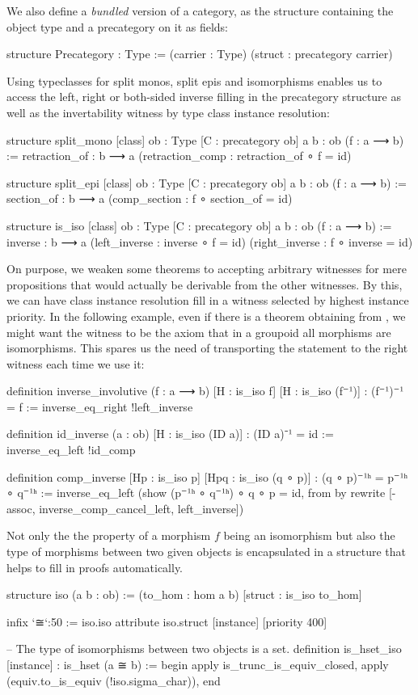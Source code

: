 We also define a \emph{bundled} version of a category, as the structure containing
the object type and a precategory on it as fields:
\begin{leancode}
structure Precategory : Type :=
  (carrier : Type)
  (struct : precategory carrier)
\end{leancode}

Using typeclasses for split monos, split epis and isomorphisms enables us to access
the left, right or both-sided inverse filling in the precategory structure as
well as the invertability witness by type class instance resolution:
\begin{leancode}
structure split_mono [class]
    {ob : Type} [C : precategory ob] {a b : ob} (f : a ⟶ b) :=
  {retraction_of : b ⟶ a}
  (retraction_comp : retraction_of ∘ f = id)

structure split_epi [class]
    {ob : Type} [C : precategory ob] {a b : ob} (f : a ⟶ b) :=
  {section_of : b ⟶ a}
  (comp_section : f ∘ section_of = id)

structure is_iso [class]
    {ob : Type} [C : precategory ob] {a b : ob} (f : a ⟶ b) :=
  {inverse : b ⟶ a}
  (left_inverse  : inverse ∘ f = id)
  (right_inverse : f ∘ inverse = id)
\end{leancode}

On purpose, we weaken some theorems to accepting arbitrary witnesses for mere propositions
that would actually be derivable from the other witnesses.
By this, we can have class instance resolution fill in a witness selected by
highest instance priority.
In the following example, even if there is a theorem obtaining 
from , we might want the witness to be the axiom that in a groupoid
all morphisms are isomorphisms.
This spares us the need of transporting the statement to the right witness each
time we use it:
\begin{leancode}
definition inverse_involutive (f : a ⟶ b) [H : is_iso f] [H : is_iso (f⁻¹)]
  : (f⁻¹)⁻¹ = f :=
inverse_eq_right !left_inverse

definition id_inverse (a : ob) [H : is_iso (ID a)] : (ID a)⁻¹ = id :=
inverse_eq_left !id_comp

definition comp_inverse [Hp : is_iso p] [Hpq : is_iso (q ∘ p)] :
  (q ∘ p)⁻¹ʰ = p⁻¹ʰ ∘ q⁻¹ʰ :=
inverse_eq_left (show (p⁻¹ʰ ∘ q⁻¹ʰ) ∘ q ∘ p = id, from
  by rewrite [-assoc, inverse_comp_cancel_left, left_inverse])
\end{leancode}

Not only the the property of a morphism $f$ being an isomorphism but also the type
of morphisms between two given objects is encapsulated in a structure that
helps to fill in proofs automatically. %
\begin{leancode}
structure iso (a b : ob) :=
  (to_hom : hom a b)
  [struct : is_iso to_hom]

infix `≅`:50 := iso.iso
attribute iso.struct [instance] [priority 400]

-- The type of isomorphisms between two objects is a set.
definition is_hset_iso [instance] : is_hset (a ≅ b) :=
begin
  apply is_trunc_is_equiv_closed,
    apply (equiv.to_is_equiv (!iso.sigma_char)),
end
\end{leancode}

